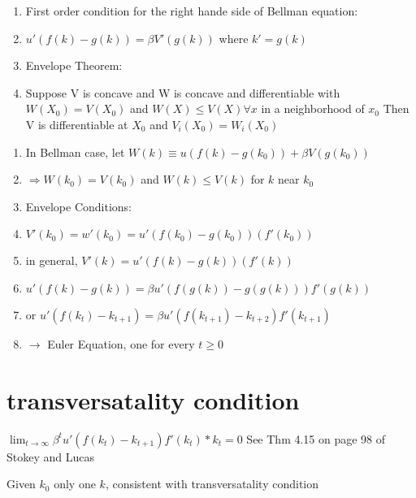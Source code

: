 \documentclass{article}
\begin{document}
\begin{enumerate}
    \item First order condition for the right hande side of Bellman equation:
    \item $u'(f(k) - g(k)) = \beta V'(g(k))$ where $k' = g(k)$
    \item Envelope Theorem:
    \item Suppose V is concave and W is concave and differentiable with
    $W(X_0) = V(X_0)$ and $W(X) \leq V(X) \forall x$ in a neighborhood of $x_0$
    Then V is differentiable at $X_0$ and $V_i(X_0) = W_i(X_0)$

\end{enumerate}


\begin{enumerate}
    \item In Bellman case, let $W(k) \equiv u(f(k) - g(k_0)) + \beta V(g(k_0))$
    \item $\Rightarrow W(k_0) = V(k_0)$ and $W(k) \leq V(k)$ for $k$ near $k_0$
    \item Envelope Conditions:
    \item $V'(k_0) = w'(k_0) = u'(f(k_0) - g(k_0))(f'(k_0))$
    \item in general, $V'(k) = u'(f(k) - g(k))(f'(k))$
    \item $u'(f(k) - g(k)) = \beta u'(f(g(k)) - g(g(k)))f'(g(k))$
    \item or $u'(f(k_t)-k_{t+1}) = \beta u'(f(k_{t+1}) - k_{t+2})f'(k_{t+1})$
    \item $\rightarrow$ Euler Equation, one for every $t \geq 0$
\end{enumerate}

\section{transversatality condition}
$\lim_{t \to \infty} \beta^t u'(f(k_t) - k_{t+1})f'(k_t)*k_t = 0$
See Thm 4.15 on page 98 of Stokey and Lucas

Given $k_0$ only one $k$, consistent with transversatality condition
\end{document}
